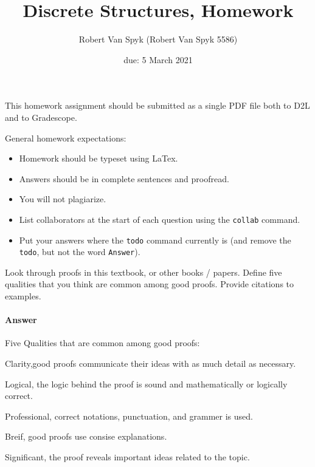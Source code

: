 \documentclass{article}
\title{Discrete Structures, Homework \hwnum}
\author{{Robert Van Spyk} ({Robert Van Spyk 5586})}
\date{due: 5 March 2021}
\begin{document}
\maketitle

This homework assignment should be
submitted as a single PDF file both to D2L and to Gradescope.

General homework expectations:
\begin{itemize}
    \item Homework should be typeset using LaTex.
    \item Answers should be in complete sentences and proofread.
    \item You will not plagiarize.
    \item List collaborators at the start of each question using the \texttt{collab} command.
    \item Put your answers where the \texttt{todo} command currently is (and
        remove the \texttt{todo}, but not the word \texttt{Answer}).
\end{itemize}


 

Look through proofs in this textbook, or other books / papers.  Define five
qualities that you think are common among good proofs. Provide citations to
examples.


\paragraph{Answer}

{Five Qualities that are common among good proofs: }


{Clarity,good proofs communicate their ideas with as much detail as necessary.}

{Logical, the logic behind the proof is sound and mathematically or logically correct.}

{Professional, correct notations, punctuation, and grammer is used.}

{Breif, good proofs use consise explanations.}

{Significant, the proof reveals important ideas related to the topic.}
\end{document}

